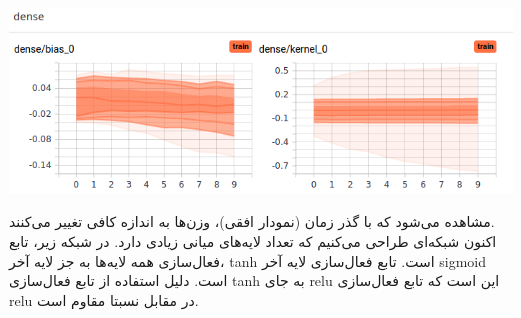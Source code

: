 \documentclass{article}
\begin{document}
\begin{center}
	\includegraphics[scale=0.60]{model_a_dense.png} 
\end{center}    

مشاهده می‌شود که با گذر زمان (نمودار افقی)، وزن‌ها به اندازه کافی تغییر می‌کنند. \\

اکنون شبکه‌ای طراحی می‌کنیم که تعداد لایه‌های میانی زیادی دارد. در شبکه زیر، تابع فعال‌سازی همه لایه‌ها به جز لایه آخر، tanh است. تابع فعال‌سازی لایه آخر sigmoid است. دلیل استفاده از تابع فعال‌سازی tanh به جای relu این است که تابع فعال‌سازی relu در مقابل  نسبتا مقاوم است.
\end{document}
